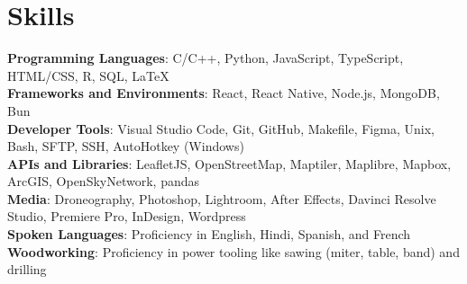 \documentclass[letterpaper,11pt]{article}
\begin{document}
%
\section{Skills}
 \begin{itemize}[leftmargin=0.15in, label={}]
    \small{\item{
     \textbf{Programming Languages}{: C/C++, Python, JavaScript, TypeScript, HTML/CSS, R, SQL, LaTeX} \\
     \textbf{Frameworks and Environments}{: React, React Native, Node.js, MongoDB, Bun} \\
     \textbf{Developer Tools}{: Visual Studio Code, Git, GitHub, Makefile, Figma, Unix, Bash, SFTP, SSH, AutoHotkey (Windows)} \\
     \textbf{APIs and Libraries}{: LeafletJS, OpenStreetMap, Maptiler, Maplibre, Mapbox, ArcGIS, OpenSkyNetwork, pandas} \\
     \textbf{Media}{: Droneography, Photoshop, Lightroom, After Effects, Davinci Resolve Studio, Premiere Pro, InDesign, Wordpress} \\
     \textbf{Spoken Languages}{: Proficiency in English, Hindi, Spanish, and French} \\
     \textbf{Woodworking}{: Proficiency in power tooling like sawing (miter, table, band) and drilling}
    }}
 \end{itemize}


\end{document}

